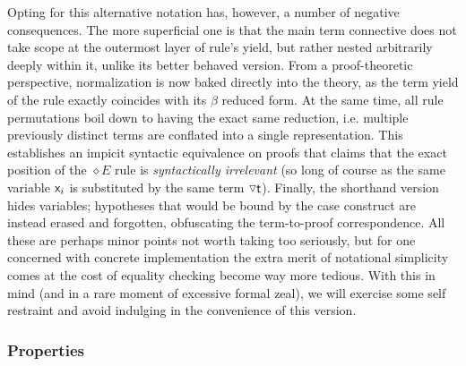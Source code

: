 Opting for this alternative notation has, however, a number of negative consequences.
The more superficial one is that the main term connective does not take scope at the outermost layer of rule's yield, but rather nested arbitrarily deeply within it, unlike its better behaved version.
From a proof-theoretic perspective, normalization is now baked directly into the theory, as the term yield of the rule exactly coincides with its $\beta$ reduced form.
At the same time, all rule permutations boil down to having the exact same reduction, i.e. multiple previously distinct terms are conflated into a single representation.
This establishes an impicit syntactic equivalence on proofs that claims that the exact position of the $\diamond E$ rule is \textit{syntactically irrelevant} (so long of course as the same variable $\mathsf{\mathsf{x}_{\mathnormal{i}} }$ is substituted by the same term $\smallterm{\diaelim t}$).
Finally, the shorthand version hides variables; hypotheses that would be bound by the case construct are instead erased and forgotten, obfuscating the term-to-proof correspondence.
All these are perhaps minor points not worth taking too seriously, but for one concerned with concrete implementation the extra merit of notational simplicity comes at the cost of equality checking become way more tedious.
With this in mind (and in a rare moment of excessive formal zeal), we will exercise some self restraint and avoid indulging in the convenience of this version.

\subsubsection{Properties}

